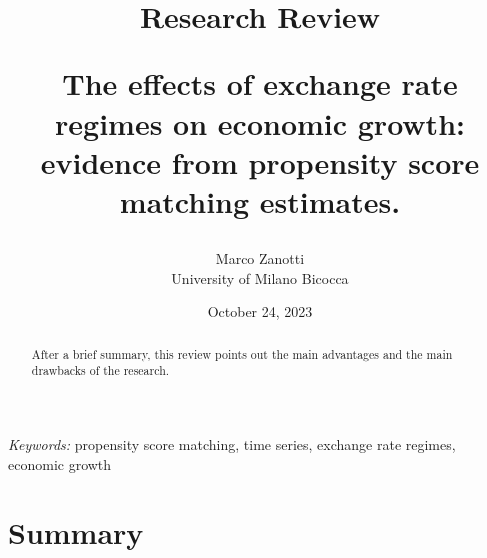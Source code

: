 \documentclass[
  12pt]{article}
\begin{document}
\def\spacingset#1{\renewcommand{\baselinestretch}%
{#1}\small\normalsize} \spacingset{1}



\date{October 24, 2023}
\title{\bf Research Review

The effects of exchange rate regimes on economic growth: evidence from
propensity score matching estimates.}
\author{
Marco Zanotti\\
University of Milano Bicocca\\
}
\maketitle

\bigskip
\bigskip
\begin{abstract}
After a brief summary, this review points out the main advantages and
the main drawbacks of the research.
\end{abstract}

\noindent%
{\it Keywords:} propensity score matching, time series, exchange rate
regimes, economic growth
\vfill

\newpage
\spacingset{1.9} %
\ifdefined\Shaded\renewenvironment{Shaded}{\begin{tcolorbox}[borderline west={3pt}{0pt}{shadecolor}, enhanced, boxrule=0pt, sharp corners, interior hidden, breakable, frame hidden]}{\end{tcolorbox}}\fi

\hypertarget{summary}{%
\section{Summary}\label{summary}}
\end{document}
